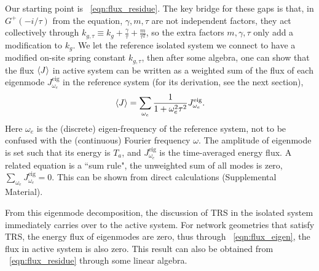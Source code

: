 \documentclass[
 amsmath,amssymb,
 aps,
 pre,
 longbibliography,
 10pt, onecolumn,
 notitlepage
]{revtex4-1}
\begin{document}
Our starting point is \eqnname~\eqref{eqn:flux_residue}. The key bridge for these gaps is that, in $G^+(-i/\tau)$ from the equation, $\gamma,m,\tau$ are not independent factors, they act collectively through $k_{g,\tau} \equiv k_g+\frac{\gamma}{\tau}+\frac{m}{\tau^2}$, so the extra factors $m,\gamma, \tau$ only add a modification to $k_g$.
We let the reference isolated system we connect to have a modified on-site spring constant $k_{g,\tau}$, then after some algebra, one can show that the flux $\expval{J}$ in active system can be written as a weighted sum of the flux of each eigenmode $J^{\text{eig}}_{\omega_e}$ in the reference system (for its derivation, see the next section),
\begin{equation} \label{eqn:flux_eigen}
    \expval{J} = \sum_{\omega_e} \frac{1}{1+\omega_e^2\tau^2} J^{\text{eig}}_{\omega_e}.
\end{equation}
Here $\omega_e$ is the (discrete) eigen-frequency of the reference system, not to be confused with the (continuous) Fourier frequency $\omega$. The amplitude of eigenmode is set such that its energy is $T_a$, and $J^{\text{eig}}_{\omega_e}$ is the time-averaged energy flux.
A related equation is a ``sum rule", the unweighted sum of all modes is zero, $\sum_{\omega_e} J^{\text{eig}}_{\omega_e} = 0$. This can be shown from direct calculations (Supplemental Material).

From this eigenmode decomposition, the discussion of TRS in the isolated system \cite{Nash2015TopologicalMechanics} immediately carries over to the active system. For network geometries that satisfy TRS, the energy flux of eigenmodes are zero, thus through \eqnname~\eqref{eqn:flux_eigen}, the flux in active system is also zero. This result can also be obtained from \eqnname~\eqref{eqn:flux_residue} through some linear algebra.
\end{document}
